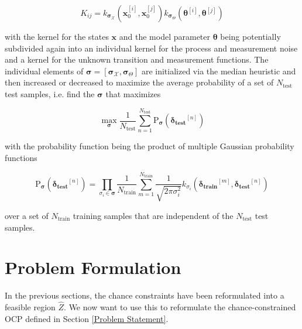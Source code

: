 \begin{equation} \label{Kernel equation}
K_{ij} = k_{\boldsymbol{\sigma}_\mathcal{X}}(\boldsymbol{x}_0^{[i]}, \boldsymbol{x}_0^{[j]}) k_{\boldsymbol{\sigma}_{\Theta}}(\boldsymbol{\theta}^{[i]}, \boldsymbol{\theta}^{[j]})
\end{equation}

with the kernel for the states $\boldsymbol{x}$ and the model parameter $\boldsymbol{\theta}$ being potentially subdivided again into an individual kernel for the process and measurement noise and a kernel for the unknown transition and measurement functions. The individual elements of $\boldsymbol{\sigma} = [\boldsymbol{\sigma}_\mathcal{X}, \boldsymbol{\sigma}_{\Theta}]$ are initialized via the median heuristic \cite{Damien_18} and then increased or decreased to maximize the average probability of a set of $N_\text{test}$ test samples, i.e. find the $\boldsymbol{\sigma}$ that maximizes

 \begin{equation} \label{Average Probability}
\max\limits_{\boldsymbol{\sigma}} \frac{1}{N_\text{test}}  \sum_{n= 1}^{N_\text{test}} \text{P}_{\boldsymbol{\sigma}} ( \boldsymbol{\delta_\text{test}}^{[n]} )
\end{equation}

with the probability function being the product of multiple Gaussian probability functions 

 \begin{equation} \label{Gaussian Probability}
\text{P}_{\boldsymbol{\sigma}} ( \boldsymbol{\delta_\text{test}}^{[n]} ) = \prod_{\sigma_i \in \boldsymbol{\sigma}} \frac{1}{N_\text{train}} \sum_{m = 1}^{N_\text{train}} \frac{1}{\sqrt{2 \pi \sigma_i^2}} k_{\sigma_i}(\boldsymbol{\delta_\text{train}}^{[m]} ,\boldsymbol{\delta_\text{test}}^{[n]})
\end{equation}

over a set of $N_\text{train}$ training samples that are independent of the $N_\text{test}$ test samples.


\section{Problem Formulation} \label{Problem Formulation}

In the previous sections, the chance constraints have been reformulated into a feasible region $\hat{Z}$. We now want to use this to reformulate the chance-constrained OCP defined in Section \ref{Problem Statement}. 


